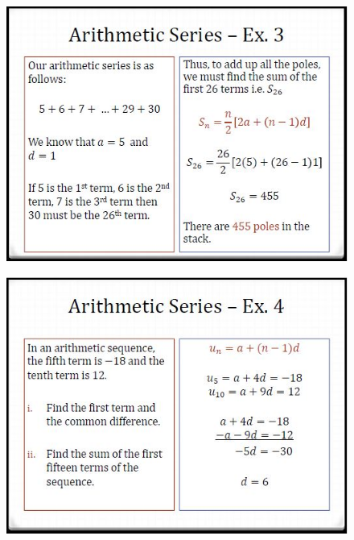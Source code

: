 \documentclass{beamer}
\begin{document}
\begin{frame}
	\begin{figure}
		\centering
		\includegraphics[width=0.99\linewidth]{SeqSer18C}
	\end{figure}
	
\end{frame}	
\begin{frame}
	\begin{figure}
		\centering
		\includegraphics[width=0.99\linewidth]{SeqSer18D}
	\end{figure}
	
\end{frame}
\end{document}
